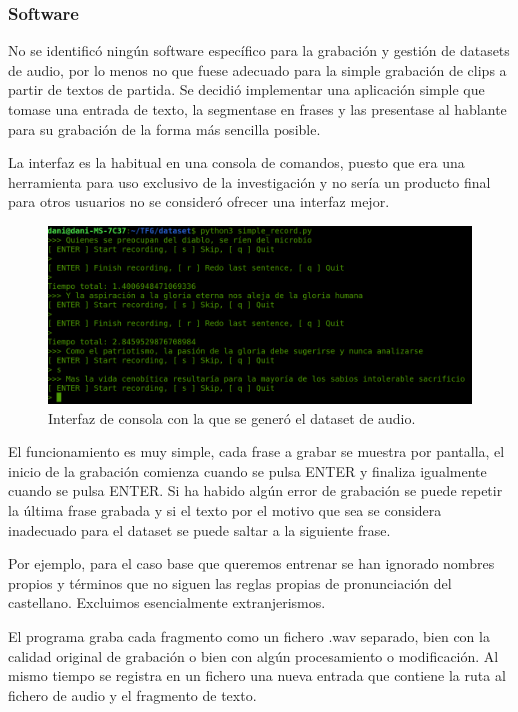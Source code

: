 \subsubsection{Software}

No se identificó ningún software específico para la grabación y gestión de datasets de audio, por lo menos no que fuese adecuado para la simple grabación de clips a partir de textos de partida. Se decidió implementar una aplicación simple que tomase una entrada de texto, la segmentase en frases y las presentase al hablante para su grabación de la forma más sencilla posible.

La interfaz es la habitual en una consola de comandos, puesto que era una herramienta para uso exclusivo de la investigación y no sería un producto final para otros usuarios no se consideró ofrecer una interfaz mejor.

\begin{figure}[H]
\centering
\includegraphics[width=14cm]{Z_anexos_img/record-0.png}
\caption{Interfaz de consola con la que se generó el dataset de audio.}
\label{fig:figure1}
\end{figure}

El funcionamiento es muy simple, cada frase a grabar se muestra por pantalla, el inicio de la grabación comienza cuando se pulsa ENTER y finaliza igualmente cuando se pulsa ENTER. Si ha habido algún error de grabación se puede repetir la última frase grabada y si el texto por el motivo que sea se considera inadecuado para el dataset se puede saltar a la siguiente frase.

Por ejemplo, para el caso base que queremos entrenar se han ignorado nombres propios y términos que no siguen las reglas propias de pronunciación del castellano. Excluimos esencialmente extranjerismos. 

El programa graba cada fragmento como un fichero .wav separado, bien con la calidad original de grabación o bien con algún procesamiento o modificación. Al mismo tiempo se registra en un fichero una nueva entrada que contiene la ruta al fichero de audio y el fragmento de texto.

